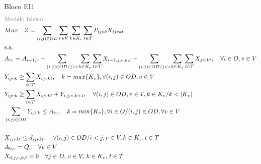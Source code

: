\begin{bloque1}{Bloco \hypertarget{frase:EI1}{EI1} }
\allowdisplaybreaks
\begin{align}
	 & \textcolor{gray}{\text{Modelo básico}} \notag   \\
	 & Max \quad Z = \sum_{(i,j)\in OD} \sum_{v\in V} \sum_{k\in K_v} \sum_{t\in T} P_{ijvk} X_{ijvkt}     \label{eq: m1_fo}                                                                                                  \\
	 & \text{s.a.}  \notag                                                                                                                                                                                                        \\
	 & A_{iv} = A_{i-1,v} - \sum_{(i,j) \in OD/j \geq i} \sum_{k\in K_v}\sum_{t\in T}X_{i-1,j,v,k,t} + \sum_{(i,j) \in OD/j<i} \sum_{k\in K_v}\sum_{t\in T}X_{jivkt}, \quad \forall i \in O, v \in V   \label{eq: m1_disponi} \\
	 & Y_{ijvk} \geq  \sum_{t \in T} X_{ijvkt},  \quad k = max\{K_v\}, \forall(i,j) \in OD ,v \in V     \label{eq: m1_autho_mayor_assig_1er_class}                                                                      \\
	 & Y_{ijvk} \geq  \sum_{t \in T} X_{ijvkt} + Y_{i,j,v,k + 1} , \quad \forall(i,j) \in OD, v \in V, k \in K_v / k <  |K_v|    \label{eq: m1_autho_mayor_assig_mas_autho}                                    \\
	 & \sum_{(i,j) \in OD} Y_{ijvk} \leq A_{iv}, \quad  k = min\{K_v\}, \forall i \in O / (i,j) \in OD,   \forall v \in V       \label{eq: m1_cap_autho_1er_class}                                                           \\
	 & \notag \text{ }\\
	 & X_{ijvkt} \leq d_{ijvkt},  \quad \forall (i,j) \in OD / i < j  ,v \in V, k \in K_v, t\in T   \label{eq: m1_assig_menor_dem}                                                                                           \\
	 & A_{0,v} = Q_v \quad \forall v \in V  \label{eq: m1_ini_disponi}                                                                                                                                                        \\
	 & X_{0,j,v,k,t} = 0 \quad \forall j \in D,\, v \in V,\, k \in K_v,\, t \in T  \label{eq: m1_ini_assig}                                                                                                                   \\

\end{align}
\end{bloque1}
